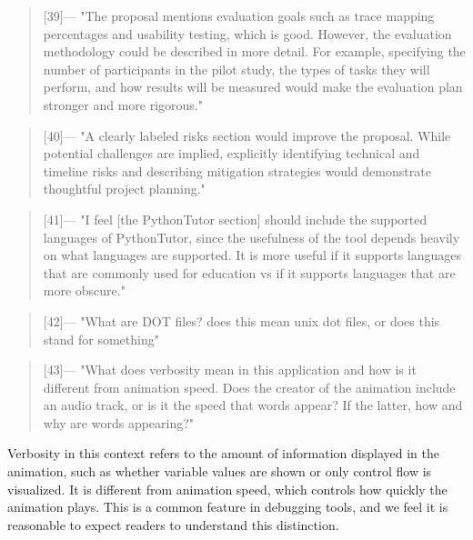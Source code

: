 \begin{quotation} [39]---%
  "The proposal mentions evaluation goals such as trace mapping percentages and usability testing, which is good. However, the evaluation methodology could be described in more detail. For example, specifying the number of participants in the pilot study, the types of tasks they will perform, and how results will be measured would make the evaluation plan stronger and more rigorous."
\end{quotation}

\begin{quotation} [40]---%
  "A clearly labeled risks section would improve the proposal. While potential challenges are implied, explicitly identifying technical and timeline risks and describing mitigation strategies would demonstrate thoughtful project planning."
\end{quotation}

\noindent\hrulefill

\begin{quotation} [41]---%
  "I feel [the PythonTutor section] should include the supported languages of PythonTutor, since the usefulness of the tool depends heavily on what languages are supported. It is more useful if it supports languages that are commonly used for education vs if it supports languages that are more obscure."
\end{quotation}

\begin{quotation} [42]---%
  "What are DOT files? does this mean unix dot files, or does this stand for something"
\end{quotation}

\begin{quotation} [43]---%
  "What does verbosity mean in this application and how is it different from animation speed. Does the creator of the animation include an audio track, or is it the speed that words appear? If the latter, how and why are words appearing?"
\end{quotation}
\noindent Verbosity in this context refers to the amount of information displayed in the animation, such as whether variable values are shown or only control flow is visualized. It is different from animation speed, which controls how quickly the animation plays. This is a common feature in debugging tools, and we feel it is reasonable to expect readers to understand this distinction.

